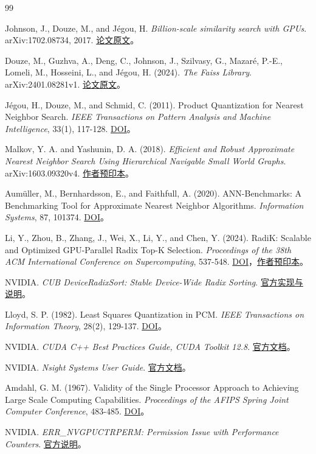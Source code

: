 \documentclass[UTF8,a4paper,zihao=5,fontset=none]{ctexart}
\begin{document}
\begingroup\small\linespread{1.0}\selectfont\begin{thebibliography}{99}\setlength{\itemsep}{1pt}\setlength{\parskip}{0pt}

Johnson, J., Douze, M., and Jégou, H. \emph{Billion-scale similarity search with GPUs}. arXiv:1702.08734, 2017. \href{https://arxiv.org/abs/1702.08734}{论文原文}。

Douze, M., Guzhva, A., Deng, C., Johnson, J., Szilvasy, G., Mazaré, P.-E., Lomeli, M., Hosseini, L., and Jégou, H. (2024). \emph{The Faiss Library}. arXiv:2401.08281v1. \href{https://arxiv.org/abs/2401.08281v1}{论文原文}。

Jégou, H., Douze, M., and Schmid, C. (2011). Product Quantization for Nearest Neighbor Search. \emph{IEEE Transactions on Pattern Analysis and Machine Intelligence}, 33(1), 117-128. \href{https://doi.org/10.1109/TPAMI.2010.57}{DOI}。

Malkov, Y. A. and Yashunin, D. A. (2018). \emph{Efficient and Robust Approximate Nearest Neighbor Search Using Hierarchical Navigable Small World Graphs}. arXiv:1603.09320v4. \href{https://arxiv.org/abs/1603.09320v4}{作者预印本}。

Aumüller, M., Bernhardsson, E., and Faithfull, A. (2020). ANN-Benchmarks: A Benchmarking Tool for Approximate Nearest Neighbor Algorithms. \emph{Information Systems}, 87, 101374. \href{https://doi.org/10.1016/j.is.2019.02.006}{DOI}。

Li, Y., Zhou, B., Zhang, J., Wei, X., Li, Y., and Chen, Y. (2024). RadiK: Scalable and Optimized GPU-Parallel Radix Top-K Selection. \emph{Proceedings of the 38th ACM International Conference on Supercomputing}, 537-548. \href{https://doi.org/10.1145/3650200.3656596}{DOI}，\href{https://arxiv.org/abs/2501.14336}{作者预印本}。

NVIDIA. \emph{CUB DeviceRadixSort: Stable Device-Wide Radix Sorting}. \href{https://github.com/NVIDIA/cccl/blob/main/cub/cub/device/device_radix_sort.cuh}{官方实现与说明}。

Lloyd, S. P. (1982). Least Squares Quantization in PCM. \emph{IEEE Transactions on Information Theory}, 28(2), 129-137. \href{https://doi.org/10.1109/TIT.1982.1056489}{DOI}。

NVIDIA. \emph{CUDA C++ Best Practices Guide, CUDA Toolkit 12.8}. \href{https://docs.nvidia.com/cuda/archive/12.8.0/cuda-c-best-practices-guide/}{官方文档}。

NVIDIA. \emph{Nsight Systems User Guide}. \href{https://docs.nvidia.com/nsight-systems/UserGuide/index.html}{官方文档}。

Amdahl, G. M. (1967). Validity of the Single Processor Approach to Achieving Large Scale Computing Capabilities. \emph{Proceedings of the AFIPS Spring Joint Computer Conference}, 483-485. \href{https://doi.org/10.1145/1465482.1465560}{DOI}。

NVIDIA. \emph{ERR\_NVGPUCTRPERM: Permission Issue with Performance Counters}. \href{https://developer.nvidia.com/ERR_NVGPUCTRPERM}{官方说明}。

\end{thebibliography}\endgroup
\end{document}
